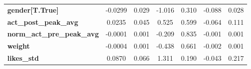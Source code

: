 \begin{center}
\begin{tabular}{lcccccc}
\textbf{gender[T.True]}            &      -0.0299  &        0.029     &    -1.016  &         0.310        &       -0.088    &        0.028     \\
\textbf{act\_post\_peak\_avg}      &       0.0235  &        0.045     &     0.525  &         0.599        &       -0.064    &        0.111     \\
\textbf{norm\_act\_pre\_peak\_avg} &      -0.0001  &        0.001     &    -0.209  &         0.835        &       -0.001    &        0.001     \\
\textbf{weight}                    &      -0.0004  &        0.001     &    -0.438  &         0.661        &       -0.002    &        0.001     \\
\textbf{likes\_std}                &       0.0870  &        0.066     &     1.311  &         0.190        &       -0.043    &        0.217     \\
\bottomrule
\end{tabular}
\end{center}